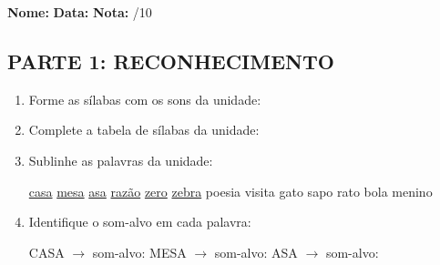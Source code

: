 \begin{exercicio}

\noindent\textbf{Nome:} \underline{\hspace{3.2cm}} \quad \textbf{Data:} \underline{\hspace{1.6cm}} \quad \textbf{Nota:} \underline{\hspace{0.9cm}}/10


\subsection*{PARTE 1: RECONHECIMENTO}

\begin{enumerate}

  \item Forme as sílabas com os sons da unidade:

\begin{center}
\end{center}

  \item Complete a tabela de sílabas da unidade:

\begin{center}
\end{center}

  \item Sublinhe as palavras da unidade:

\begin{center}
  \uline{casa} \quad \uline{mesa} \quad \uline{asa} \quad \uline{razão} \quad \uline{zero} \quad \uline{zebra} \quad poesia \quad visita \quad gato \quad sapo \quad rato \quad bola \quad menino
\end{center}

  \item Identifique o som-alvo em cada palavra:
  \begin{center}
  CASA $\rightarrow$ som-alvo: \underline{\hspace{1cm}} \quad MESA $\rightarrow$ som-alvo: \underline{\hspace{1cm}} \quad ASA $\rightarrow$ som-alvo: \underline{\hspace{1cm}}
  \end{center}


\end{enumerate}
\end{exercicio}
